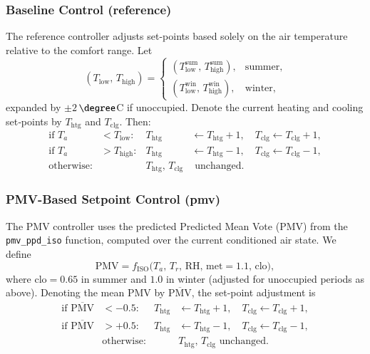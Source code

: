 \subsubsection{Baseline Control (reference)}
\label{sec:reference_control}
The reference controller adjusts set-points based solely on the air temperature relative to the comfort range. Let
\[
(T_\mathrm{low},\,T_\mathrm{high}) = 
\begin{cases}
(T_\mathrm{low}^\mathrm{sum},\,T_\mathrm{high}^\mathrm{sum}), & \text{summer},\\
(T_\mathrm{low}^\mathrm{win},\,T_\mathrm{high}^\mathrm{win}), & \text{winter},
\end{cases}
\]
expanded by \(\pm2\)\,$\degree$C if unoccupied. Denote the current heating and cooling set‐points by \(T_\mathrm{htg}\) and \(T_\mathrm{clg}\). Then:
\begin{equation}
\begin{aligned}
\text{if } T_a &< T_\mathrm{low}: & T_\mathrm{htg}&\leftarrow T_\mathrm{htg}+1,\quad T_\mathrm{clg}\leftarrow T_\mathrm{clg}+1,\\
\text{if } T_a &> T_\mathrm{high}: & T_\mathrm{htg}&\leftarrow T_\mathrm{htg}-1,\quad T_\mathrm{clg}\leftarrow T_\mathrm{clg}-1,\\
\text{otherwise:} & & T_\mathrm{htg},\,T_\mathrm{clg}&\text{ unchanged.}
\end{aligned}
\end{equation}

\subsubsection{PMV-Based Setpoint Control (pmv)}
\label{sec:pmv_control}
The PMV controller uses the predicted Predicted Mean Vote (PMV) from the \texttt{pmv\_ppd\_iso} function, computed over the current conditioned air state. We define
\[
\mathrm{PMV} = f_\mathrm{ISO}\bigl(T_a,\,T_r,\,\mathrm{RH},\,\mathrm{met}=1.1,\,\mathrm{clo}\bigr),
\]
where \(\mathrm{clo}=0.65\) in summer and \(1.0\) in winter (adjusted for unoccupied periods as above). Denoting the mean PMV by \(\overline{\mathrm{PMV}}\), the set-point adjustment is
\begin{equation}
\begin{aligned}
\text{if } \overline{\mathrm{PMV}} &< -0.5: & T_\mathrm{htg}&\leftarrow T_\mathrm{htg}+1,\quad T_\mathrm{clg}\leftarrow T_\mathrm{clg}+1,\\
\text{if } \overline{\mathrm{PMV}} &> +0.5: & T_\mathrm{htg}&\leftarrow T_\mathrm{htg}-1,\quad T_\mathrm{clg}\leftarrow T_\mathrm{clg}-1,\\
\quad \quad & \text{otherwise:} & & T_\mathrm{htg},\,T_\mathrm{clg} \text{ unchanged.}
\end{aligned}
\end{equation}

